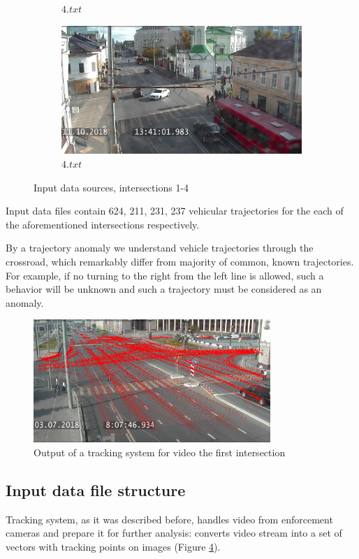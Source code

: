 \begin{figure}[!htb]
\begin{subfigure}[!htb]{0.48\textwidth}
		\caption{$4.txt$}
		\label{fig:is_3}
	\end{subfigure}
	\hfill
	\begin{subfigure}[!htb]{0.48\textwidth}
		\centering{}
		\includegraphics[width=\textwidth]{images/is-4.jpg}
		\caption{$4.txt$}
		\label{fig:is_4}
	\end{subfigure}
	\caption{Input data sources, intersections 1-4}
	\label{fig:is_all}
\end{figure}

Input data files contain 624, 211, 231, 237 vehicular trajectories for the each of the aforementioned intersections respectively.

By a trajectory anomaly we understand vehicle trajectories through the crossroad, which remarkably differ from majority of common, known trajectories. For example, if no turning to the right from the left line is allowed, such a behavior will be unknown and such a trajectory must be considered as an anomaly.

\begin{figure}[!htb]
	\centering{}
	\includegraphics[width=0.8\textwidth]{images/tr-p.png}
	\caption{Output of a tracking system for video the first intersection}
	\label{fig:tr_p}
\end{figure}

\subsection{Input data file structure}
Tracking system, as it was described before, handles video from enforcement cameras and prepare it for further analysis: converts video stream into a set of vectors with tracking points on images (Figure \ref{fig:tr_p}).

